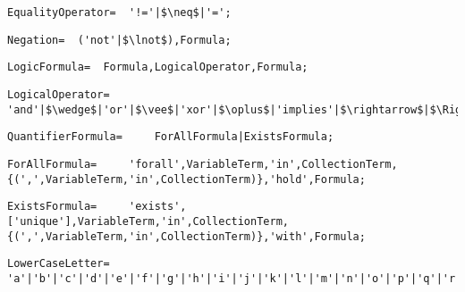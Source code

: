 \documentclass{article}
\begin{document}
    \begin{flushleft}
    \begin{lstlisting}[mathescape=true, breaklines=true]
     EqualityOperator= 	'!='|$\neq$|'=';
    \end{lstlisting}
    \end{flushleft}
    \begin{flushleft}
    \begin{lstlisting}[mathescape=true, breaklines=true]
     Negation= 	('not'|$\lnot$),Formula;
    \end{lstlisting}
    \end{flushleft}
    \begin{flushleft}
    \begin{lstlisting}[mathescape=true, breaklines=true]
     LogicFormula= 	Formula,LogicalOperator,Formula;
    \end{lstlisting}
    \end{flushleft}
    \begin{flushleft}
    \begin{lstlisting}[mathescape=true, breaklines=true]
     LogicalOperator= 	'and'|$\wedge$|'or'|$\vee$|'xor'|$\oplus$|'implies'|$\rightarrow$|$\Rightarrow$|'iff'|$\leftrightarrow$|$\Leftrightarrow$;
    \end{lstlisting}
    \end{flushleft}
    \begin{flushleft}
    \begin{lstlisting}[mathescape=true, breaklines=true]
     QuantifierFormula= 	ForAllFormula|ExistsFormula;
    \end{lstlisting}
    \end{flushleft}
    \begin{flushleft}
    \begin{lstlisting}[mathescape=true, breaklines=true]
     ForAllFormula= 	'forall',VariableTerm,'in',CollectionTerm,{(',',VariableTerm,'in',CollectionTerm)},'hold',Formula;
    \end{lstlisting}
    \end{flushleft}
    \begin{flushleft}
    \begin{lstlisting}[mathescape=true, breaklines=true]
     ExistsFormula= 	'exists',['unique'],VariableTerm,'in',CollectionTerm,{(',',VariableTerm,'in',CollectionTerm)},'with',Formula;
    \end{lstlisting}
    \end{flushleft}
    \begin{flushleft}
    \begin{lstlisting}[mathescape=true, breaklines=true]
     LowerCaseLetter= 	'a'|'b'|'c'|'d'|'e'|'f'|'g'|'h'|'i'|'j'|'k'|'l'|'m'|'n'|'o'|'p'|'q'|'r'|'s'|'t'|'u'|'v'|'w'|'x'|'y'|'z';
    \end{lstlisting}
    \end{flushleft}
\end{document}

